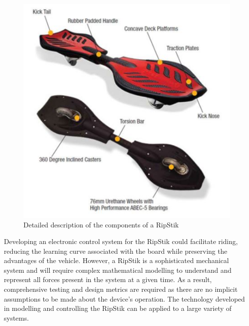 \begin{figure}[!htb]
	\centering
	\includegraphics[width=\linewidth]{RipStik.JPG}
	\caption{Detailed description of the components of a RipStik \cite{PIC}}\label{fig:RipStik}
	\endminipage
\end{figure}
\par
Developing an electronic control system for the RipStik could facilitate riding, reducing the learning curve associated with the board while preserving the advantages of the vehicle.
However, a RipStik is a sophisticated mechanical system and will require complex mathematical modelling to understand and represent all forces present in the system at a given time. 
As a result, comprehensive testing and design metrics are required as there are no implicit assumptions to be made about the device's operation. 
The technology developed in modelling and controlling the RipStik can be applied to a large variety of systems. 

